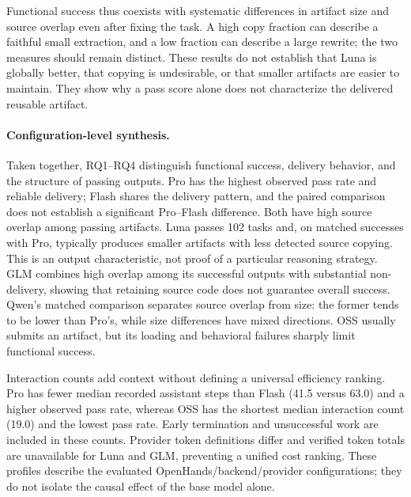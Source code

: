 \documentclass[acmsmall,screen,review,anonymous,nonacm]{acmart}
\begin{document}
Functional success thus coexists with systematic differences in artifact size
and source overlap even after fixing the task. A high copy fraction can describe
a faithful small extraction, and a low fraction can describe a large rewrite;
the two measures should remain distinct. These results do not establish that
Luna is globally better, that copying is undesirable, or that smaller artifacts
are easier to maintain. They show why a pass score alone does not characterize
the delivered reusable artifact.

\paragraph{Configuration-level synthesis.}
Taken together, RQ1--RQ4 distinguish functional success, delivery behavior,
and the structure of passing outputs. Pro has the highest observed pass rate
and reliable delivery; Flash shares the delivery pattern, and the paired
comparison does not establish a significant Pro--Flash difference. Both have
high source overlap among passing artifacts. Luna passes 102 tasks and, on
matched successes with Pro, typically produces smaller artifacts with less
detected source copying. This is an output characteristic, not proof of a
particular reasoning strategy. GLM combines high overlap among its successful
outputs with substantial non-delivery, showing that retaining source code
does not guarantee overall success. Qwen's matched comparison separates source
overlap from size: the former tends to be lower than Pro's, while size
differences have mixed directions. OSS usually submits an artifact, but its
loading and behavioral failures sharply limit functional success.

Interaction counts add context without defining a universal efficiency ranking.
Pro has fewer median recorded assistant steps than Flash (41.5 versus 63.0)
and a higher observed pass rate, whereas OSS has the shortest median interaction
count (19.0) and the lowest pass rate. Early termination and unsuccessful work
are included in these counts. Provider token definitions differ and verified
token totals are unavailable for Luna and GLM, preventing a unified cost ranking.
These profiles describe the evaluated OpenHands/backend/provider configurations;
they do not isolate the causal effect of the base model alone.

\end{document}
